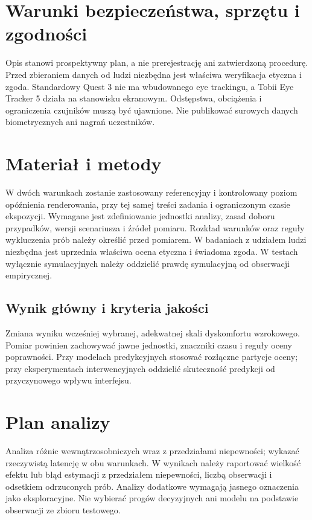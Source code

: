 \documentclass[11pt,a4paper]{article}
\begin{document}
\section{Warunki bezpieczeństwa, sprzętu i zgodności}
Opis stanowi prospektywny plan, a nie prerejestrację ani zatwierdzoną procedurę. Przed zbieraniem danych od ludzi niezbędna jest właściwa weryfikacja etyczna i zgoda. Standardowy Quest 3 nie ma wbudowanego eye trackingu, a Tobii Eye Tracker 5 działa na stanowisku ekranowym. Odstępstwa, obciążenia i ograniczenia czujników muszą być ujawnione. Nie publikować surowych danych biometrycznych ani nagrań uczestników.

\section{Materiał i metody}

W dwóch warunkach zostanie zastosowany referencyjny i kontrolowany poziom opóźnienia renderowania, przy tej samej treści zadania i ograniczonym czasie ekspozycji. Wymagane jest zdefiniowanie jednostki analizy, zasad doboru przypadków, wersji scenariusza i źródeł pomiaru. Rozkład warunków oraz reguły wykluczenia prób należy określić przed pomiarem. W badaniach z udziałem ludzi niezbędna jest uprzednia właściwa ocena etyczna i świadoma zgoda. W testach wyłącznie symulacyjnych należy oddzielić prawdę symulacyjną od obserwacji empirycznej.

\subsection{Wynik główny i kryteria jakości}

Zmiana wyniku wcześniej wybranej, adekwatnej skali dyskomfortu wzrokowego. Pomiar powinien zachowywać jawne jednostki, znaczniki czasu i reguły oceny poprawności. Przy modelach predykcyjnych stosować rozłączne partycje oceny; przy eksperymentach interwencyjnych oddzielić skuteczność predykcji od przyczynowego wpływu interfejsu.

\section{Plan analizy}

Analiza różnic wewnątrzosobniczych wraz z przedziałami niepewności; wykazać rzeczywistą latencję w obu warunkach. W wynikach należy raportować wielkość efektu lub błąd estymacji z przedziałem niepewności, liczbą obserwacji i odsetkiem odrzuconych prób. Analizy dodatkowe wymagają jasnego oznaczenia jako eksploracyjne. Nie wybierać progów decyzyjnych ani modelu na podstawie obserwacji ze zbioru testowego.
\end{document}
